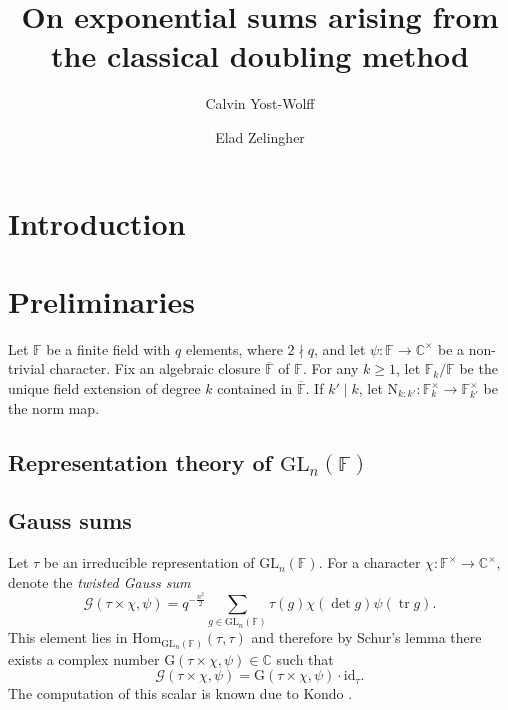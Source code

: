 \documentclass[12pt, reqno]{amsart}
\title[Doubling method exponential sums]{On exponential sums arising from the classical doubling method}
\author{Calvin Yost-Wolff}
\author{Elad Zelingher}
\theoremstyle{definition}
\theoremstyle{definition}
\theoremstyle{definition}
\newcommand{\cComplex}{\mathbb{C}}
\newcommand{\multiplicativegroup}[1]{#1^{\times}}
\newcommand{\Hom}{\mathrm{Hom}}
\newcommand{\idmap}{\mathrm{id}}
\newcommand{\fieldCharacter}{\psi}
\newcommand{\trace}{\operatorname{tr}}
\newcommand{\GL}{\mathrm{GL}}
\newcommand{\FieldNorm}[2]{\mathrm{N}_{#1:#2}}
\newcommand{\finiteField}{\mathbb{F}}
\newcommand{\finiteFieldExtension}[1]{\finiteField_{#1}}
\newcommand{\algebraicClosure}[1]{\overline{#1}}
\newcommand{\GaussSum}[2]{\mathcal{G}\left(#1, #2\right)}
\newcommand{\GaussSumScalar}[2]{\mathrm{G}\left(#1, #2\right)}
\begin{document}
\begin{abstract}
\end{abstract}
\maketitle

\section{Introduction}

\section{Preliminaries}
Let $\finiteField$ be a finite field with $q$ elements, where $2 \nmid q$, and let $\fieldCharacter \colon \finiteField \to \multiplicativegroup{\cComplex}$ be a non-trivial character. Fix an algebraic closure $\algebraicClosure{\finiteField}$ of $\finiteField$. For any $k \ge 1$, let $\finiteFieldExtension{k} \slash \finiteField$ be the unique field extension of degree $k$ contained in $\algebraicClosure{\finiteField}$. If $k' \mid k$, let $\FieldNorm{k}{k'} \colon \multiplicativegroup{\finiteFieldExtension{k}} \to \multiplicativegroup{\finiteFieldExtension{k'}}$ be the norm map.

\subsection{Representation theory of $\GL_n\left(\finiteField\right)$}

\subsection{Gauss sums}

Let $\tau$ be an irreducible representation of $\GL_n\left(\finiteField\right)$. 
For a character $\chi \colon \multiplicativegroup{\finiteField} \to \multiplicativegroup{\cComplex}$, denote the \emph{twisted Gauss sum}
$$\GaussSum{\tau \times \chi}{\fieldCharacter} = q^{-\frac{n^2}{2}} \sum_{g \in \GL_n\left(\finiteField\right)} \tau\left(g\right) \chi\left(\det g\right) \fieldCharacter\left(\trace g\right).$$
This element lies in $\Hom_{\GL_n\left(\finiteField\right)}\left(\tau, \tau\right)$ and therefore by Schur's lemma there exists a complex number $\GaussSumScalar{\tau \times \chi}{\fieldCharacter} \in \cComplex$ such that
$$\GaussSum{\tau \times \chi}{\fieldCharacter} = \GaussSumScalar{\tau \times \chi}{\fieldCharacter} \cdot \idmap_\tau.$$ The computation of this scalar is known due to Kondo \cite{Kondo1963}.
\end{document}
